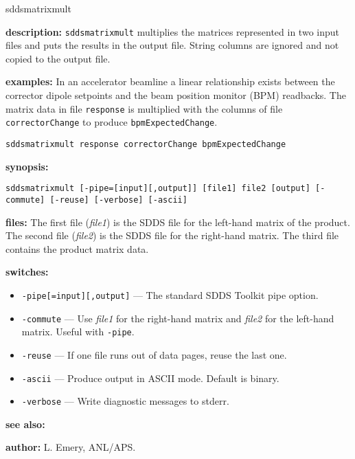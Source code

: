 \begin{sddsprog}{sddsmatrixmult}
  \item \textbf{description:} \verb|sddsmatrixmult| multiplies the matrices represented in two input files and puts the results in the output file. String columns are ignored and not copied to the output file.
  \item \textbf{examples:} In an accelerator beamline a linear relationship exists between the corrector dipole setpoints and the beam position monitor (BPM) readbacks. The matrix data in file \verb|response| is multiplied with the columns of file \verb|correctorChange| to produce \verb|bpmExpectedChange|.
    \begin{verbatim}
sddsmatrixmult response correctorChange bpmExpectedChange
    \end{verbatim}
  \item \textbf{synopsis:}
    \begin{verbatim}
sddsmatrixmult [-pipe=[input][,output]] [file1] file2 [output] [-commute] [-reuse] [-verbose] [-ascii]
    \end{verbatim}
  \item \textbf{files:} The first file (\emph{file1}) is the SDDS file for the left-hand matrix of the product. The second file (\emph{file2}) is the SDDS file for the right-hand matrix. The third file contains the product matrix data.
  \item \textbf{switches:}
    \begin{itemize}
      \item \verb|-pipe[=input][,output]| --- The standard SDDS Toolkit pipe option.
      \item \verb|-commute| --- Use \emph{file1} for the right-hand matrix and \emph{file2} for the left-hand matrix. Useful with \verb|-pipe|.
      \item \verb|-reuse| --- If one file runs out of data pages, reuse the last one.
      \item \verb|-ascii| --- Produce output in ASCII mode. Default is binary.
      \item \verb|-verbose| --- Write diagnostic messages to stderr.
    \end{itemize}
  \item \textbf{see also:} 
  \item \textbf{author:} L. Emery, ANL/APS.
\end{sddsprog}

